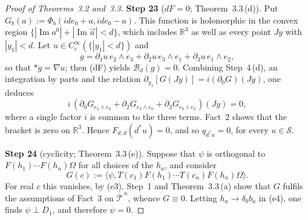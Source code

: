 \documentclass[11pt,letterpaper,reqno]{amsart}
\theoremstyle{definition}
\begin{document}
\begin{proof}[Proof of Theorems~3.2 and~3.3]
\textbf{Step 23} ($dF=0$; Theorem~3.3\,(d)).
Put $G_b(a):=\Phi_b(ide_0+a,ide_0-a)$.
This function is holomorphic in the convex region $\{|\operatorname{Im}a^0|+|\operatorname{Im}\vec a|<d\}$, which includes $\mathbb R^3$ as well as every point $Jy$ with $|y_1|<d$.
Let $u\in C_c^\infty(\{|y_1|<d\})$ and
\begin{equation*}
g=\partial_1u\,e_2\wedge e_3+\partial_2u\,e_3\wedge e_1+\partial_3u\,e_1\wedge e_2,
\end{equation*}
so that $\ast g=\nabla u$; then (dF) yields $\mathcal B_d(g)=0$.
Combining Step~4\,(d), an integration by parts and the relation $\partial_{y_1}[G(Jy)]=i(\partial_0G)(Jy)$, one deduces
\begin{equation*}
i\,(\partial_0G_{e_2\wedge e_3}+\partial_2G_{e_3\wedge e_0}+\partial_3G_{e_0\wedge e_2})(Jy)=0,
\end{equation*}
where a single factor $i$ is common to the three terms.
Fact~2 shows that the bracket is zero on $\mathbb R^3$.
Hence $F_{d,d}(d^*u)=0$, and so $q_{d^*u}=0$, for every $u\in\mathcal S$.

\textbf{Step 24} (cyclicity; Theorem~3.3\,(e)).
Suppose that $\psi$ is orthogonal to $F(h_1)\cdots F(h_n)\Omega$ for all choices of the $h_a$, and consider
\begin{equation*}
G(c):=\langle\psi,T(c_1)F(h_1)\cdots T(c_n)F(h_n)\Omega\rangle.
\end{equation*}
For real $c$ this vanishes, by (e3).
Step~1 and Theorem~3.3\,(a) show that $G$ fulfils the assumptions of Fact~3 on $\overline{\mathcal T}^{\,n}$, whence $G\equiv0$.
Letting $h_a\to\delta_0b_a$ in (e4), one finds $\psi\perp D_1$, and therefore $\psi=0$.


\end{proof}
\end{document}
